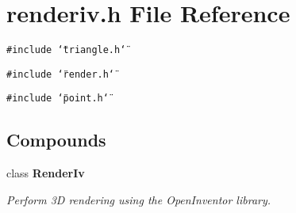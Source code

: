 \section{renderiv.h File Reference}
\label{renderiv_h}
{\tt \#include \char`\"{}triangle.h\char`\"{}}\par
{\tt \#include \char`\"{}render.h\char`\"{}}\par
{\tt \#include \char`\"{}point.h\char`\"{}}\par
\subsection*{Compounds}
\begin{CompactItemize}
\item 
class {\bf Render\-Iv}
\begin{CompactList}\small\item\em Perform 3D rendering using the Open\-Inventor library.\item\end{CompactList}\end{CompactItemize}
